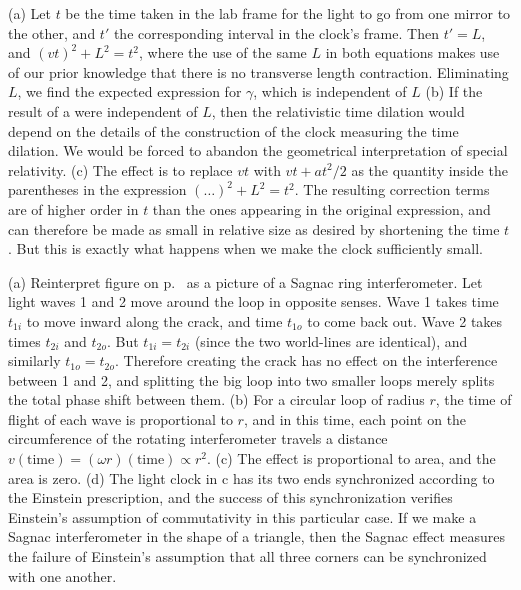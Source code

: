 

(a) Let $t$ be the time taken in the lab frame for the light to go from one mirror to the other,
and $t'$ the corresponding interval in the clock's frame. Then $t'=L$, and $(vt)^2+L^2=t^2$,
where the use of the same $L$ in both equations makes use of our prior knowledge that there
is no transverse length contraction.
Eliminating $L$, we find the expected expression for $\gamma$, which is independent of $L$
(b) If the result of a were independent of $L$, then the relativistic time dilation would depend
on the details of the construction of the clock measuring the time dilation. We would be forced
to abandon the geometrical interpretation of special relativity.
(c) The effect is to replace $vt$ with $vt+at^2/2$ as the quantity inside the parentheses
in the expression $(\ldots)^2+L^2=t^2$. The resulting correction terms are of higher order in
$t$ than the ones appearing in the original expression, and can therefore be made as small
in relative size as desired by shortening the time $t$. But this is exactly what happens when
we make the clock sufficiently small.


(a) Reinterpret figure  on p.~\pageref{fig:thomas-as-area} as a picture of a Sagnac
ring interferometer. Let light waves 1 and 2 move around the loop in opposite senses. Wave 1 takes time
$t_{1i}$ to move inward along the crack, and time $t_{1o}$ to come back out. Wave 2 takes times
$t_{2i}$ and $t_{2o}$. But $t_{1i}=t_{2i}$ (since the two world-lines are identical), and similarly
$t_{1o}=t_{2o}$. Therefore creating the crack has no effect on the interference between 1 and 2,
and splitting the big loop into two smaller loops merely splits the total phase shift between them.
(b) For a circular loop of radius $r$, the time of flight of each wave is proportional to $r$, and
in this time, each point on the circumference of the rotating interferometer travels a distance
$v(\text{time})=(\omega r)(\text{time})\propto r^2$. (c) The effect is proportional to area, and
the area is zero. (d) The light clock in c has its two ends synchronized according to the Einstein
prescription, and the success of this synchronization verifies Einstein's assumption of commutativity
in this particular case. If we make a Sagnac interferometer in the shape of a triangle, then the Sagnac
effect measures the failure of Einstein's assumption that all three corners can be synchronized
with one another.

